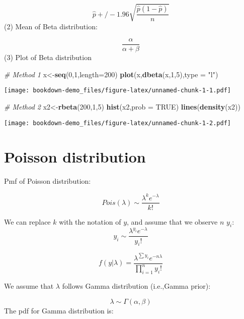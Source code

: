 \documentclass[]{book}
\newenvironment{Shaded}{\begin{snugshade}}{\end{snugshade}}
\newcommand{\CommentTok}[1]{\textcolor[rgb]{0.56,0.35,0.01}{\textit{#1}}}
\newcommand{\DataTypeTok}[1]{\textcolor[rgb]{0.13,0.29,0.53}{#1}}
\newcommand{\DecValTok}[1]{\textcolor[rgb]{0.00,0.00,0.81}{#1}}
\newcommand{\KeywordTok}[1]{\textcolor[rgb]{0.13,0.29,0.53}{\textbf{#1}}}
\newcommand{\NormalTok}[1]{#1}
\newcommand{\OtherTok}[1]{\textcolor[rgb]{0.56,0.35,0.01}{#1}}
\newcommand{\StringTok}[1]{\textcolor[rgb]{0.31,0.60,0.02}{#1}}
\begin{document}
\[\hat{p} +/- 1.96 \sqrt{\frac{\hat{p}(1-\hat{p})}{n}}\]
(2) Mean of Beta distribution:

\[\frac{\alpha}{\alpha+\beta}\]
(3) Plot of Beta distribution

\begin{Shaded}
\begin{Highlighting}[]
\CommentTok{# Method 1}
\NormalTok{x<-}\KeywordTok{seq}\NormalTok{(}\DecValTok{0}\NormalTok{,}\DecValTok{1}\NormalTok{,}\DataTypeTok{length=}\DecValTok{200}\NormalTok{)}
\KeywordTok{plot}\NormalTok{(x,}\KeywordTok{dbeta}\NormalTok{(x,}\DecValTok{1}\NormalTok{,}\DecValTok{5}\NormalTok{),}\DataTypeTok{type =} \StringTok{"l"}\NormalTok{)}
\end{Highlighting}
\end{Shaded}

\texttt{[image: bookdown-demo\_files/figure-latex/unnamed-chunk-1-1.pdf]}

\begin{Shaded}
\begin{Highlighting}[]
\CommentTok{# Method 2}
\NormalTok{x2<-}\KeywordTok{rbeta}\NormalTok{(}\DecValTok{200}\NormalTok{,}\DecValTok{1}\NormalTok{,}\DecValTok{5}\NormalTok{)}
\KeywordTok{hist}\NormalTok{(x2,}\DataTypeTok{prob =} \OtherTok{TRUE}\NormalTok{)}
\KeywordTok{lines}\NormalTok{(}\KeywordTok{density}\NormalTok{(x2))}
\end{Highlighting}
\end{Shaded}

\texttt{[image: bookdown-demo\_files/figure-latex/unnamed-chunk-1-2.pdf]}

\hypertarget{poisson-distribution}{%
\section{Poisson distribution}\label{poisson-distribution}}

Pmf of Poisson distribution:

\[Pois (\lambda) \sim \frac{\lambda^k e^{-\lambda}}{k!}\]

We can replace \(k\) with the notation of \(y\), and assume that we observe \(n\) \(y_i\):
\[y_i \sim \frac{\lambda^{y_i} e^{-\lambda}}{y_i!}\]

\[f(y|\lambda)=\frac{\lambda^{\sum y_i} e^{- n \lambda}}{\prod_{i=1}^n y_i !}\]

We assume that \(\lambda\) follows Gamma distribution (i.e.,Gamma prior):

\[\lambda \sim \Gamma(\alpha, \beta)\]
The pdf for Gamma distribution is:
\end{document}
